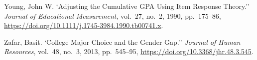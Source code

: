 \begin{list}{}{\setlength{\leftmargin}{1.5em}\setlength{\itemindent}{-1.5em}\setlength{\itemsep}{0.25em}\setlength{\parsep}{0pt}}
\item Young, John W. `Adjusting the Cumulative GPA Using Item Response Theory.'' \textit{Journal of Educational Measurement}, vol.~27, no.~2, 1990, pp.~175--86, \url{https://doi.org/10.1111/j.1745-3984.1990.tb00741.x}.
\item Zafar, Basit. `College Major Choice and the Gender Gap.'' \textit{Journal of Human Resources}, vol.~48, no.~3, 2013, pp.~545--95, \url{https://doi.org/10.3368/jhr.48.3.545}.
\end{list}
